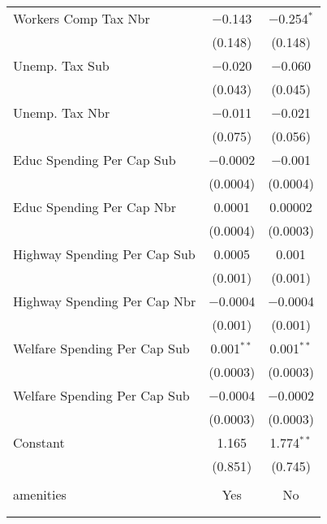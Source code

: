 \begin{table}[!htbp]
\begin{tabular}{@{\extracolsep{5pt}}lcc}
  Workers Comp Tax Nbr & $-$0.143 & $-$0.254$^{*}$ \\ 
  & (0.148) & (0.148) \\ 
  Unemp. Tax Sub & $-$0.020 & $-$0.060 \\ 
  & (0.043) & (0.045) \\ 
  Unemp. Tax Nbr & $-$0.011 & $-$0.021 \\ 
  & (0.075) & (0.056) \\ 
  Educ Spending Per Cap Sub & $-$0.0002 & $-$0.001 \\ 
  & (0.0004) & (0.0004) \\ 
  Educ Spending Per Cap Nbr & 0.0001 & 0.00002 \\ 
  & (0.0004) & (0.0003) \\ 
  Highway Spending Per Cap Sub & 0.0005 & 0.001 \\ 
  & (0.001) & (0.001) \\ 
  Highway Spending Per Cap Nbr & $-$0.0004 & $-$0.0004 \\ 
  & (0.001) & (0.001) \\ 
  Welfare Spending Per Cap Sub & 0.001$^{**}$ & 0.001$^{**}$ \\ 
  & (0.0003) & (0.0003) \\ 
  Welfare Spending Per Cap Sub & $-$0.0004 & $-$0.0002 \\ 
  & (0.0003) & (0.0003) \\ 
  Constant & 1.165 & 1.774$^{**}$ \\ 
  & (0.851) & (0.745) \\ 
 \hline \\[-1.8ex] 
amenities & Yes & No \\ 
\hline \\[-1.8ex] 
\hline 
\hline \\[-1.8ex] 
\end{tabular} 
\end{table} 
